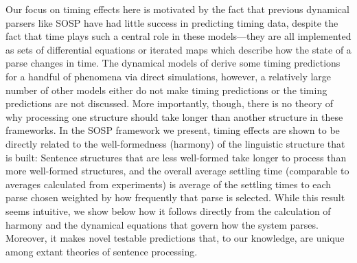 \documentclass[10pt,letterpaper]{article}
\begin{document}

Our focus on timing effects here is motivated by the fact that previous dynamical parsers like SOSP have had little success in predicting timing data, despite the fact that time plays such a central role in these models---they are all implemented as sets of differential equations or iterated maps which describe how the state of a parse changes in time. The dynamical models of  derive some timing predictions for a handful of phenomena via direct simulations, however, a relatively large number of other models \cite{vandervelde2006neural, vosse2000syntactic, cho2016bifurcation, cho2017incremental, smith2018self, gerth2009unifying} either do not make timing predictions or the timing predictions are not discussed. More importantly, though, there is no theory of why processing one structure should take longer than another structure in these frameworks. In the SOSP framework we present, timing effects are shown to be directly related to the well-formedness (harmony) \cite{smolensky1986information} of the linguistic structure that is built: Sentence structures that are less well-formed take longer to process than more well-formed structures, and the overall average settling time (comparable to averages calculated from experiments) is average of the settling times to each parse chosen weighted by how frequently that parse is selected. While this result seems intuitive, we show below how it follows directly from the calculation of harmony and the dynamical equations that govern how the system parses. Moreover, it makes novel testable predictions that, to our knowledge, are unique among extant theories of sentence processing.
\end{document}
